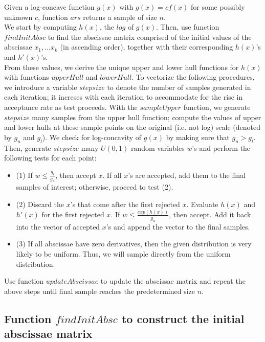 \documentclass{article}\usepackage[]{graphicx}\usepackage[]{color}
\begin{document}
Given a log-concave function $g(x)$ with $g(x)=cf(x)$ for some possibly unknown $c$, function $ars$ returns a sample of size $n$. 
\\[12pt]
We start by computing $h(x)$, the $log$ of $g(x)$. Then, use function $findInitAbsc$ to find the abscissae matrix comprised of the initial values of the abscissae $x_1,...x_k$ (in ascending order), together with their corresponding $h(x)$'s and $h'(x)$'s. 
\\[12pt]
From these values, we derive the unique upper and lower hull functions for $h(x)$ with functions $upperHull$ and $lowerHull$. To vectorize the following procedures, we introduce a variable $stepsize$ to denote the number of samples generated in each iteration; it increses with each iteration to accommodate for the rise in acceptance rate as test proceeds. With the $sampleUpper$ function, we generate $stepsize$ many samples from the upper hull function; compute the values of upper and lower hulls at these sample points on the original (i.e. not log) scale (denoted by $g_u$ and $g_l$). We check for log-concavity of $g(x)$ by making sure that $g_u>g_l$. Then, generate $stepsize$ many $U(0,1)$ random variables $w$'s and perform the following tests for each point:
\begin{itemize}
\item (1) If $w \leqslant \frac{g_l}{g_u}$, then accept $x$. If all $x$'s are accepted, add them to the final samples of interest; otherwise, proceed to test (2).
\item (2) Discard the $x$'s that come after the first rejected $x$. Evaluate $h(x)$ and $h'(x)$ for the first rejected $x$. If $w \leqslant \frac{exp(h(x))}{g_u}$, then accept. Add it back into the vector of accepted $x$'s and append the vector to the final samples.
\item (3) If all abscissae have zero derivatives, then the given distribution is very likely to be uniform. Thus, we will sample directly from the uniform distribution.
\end{itemize}
Use function $updateAbscissae$ to update the abscissae matrix and repeat the above steps until final sample reaches the predetermined size $n$.

\subsection{Function $findInitAbsc$ to construct the initial abscissae matrix}
\end{document}
